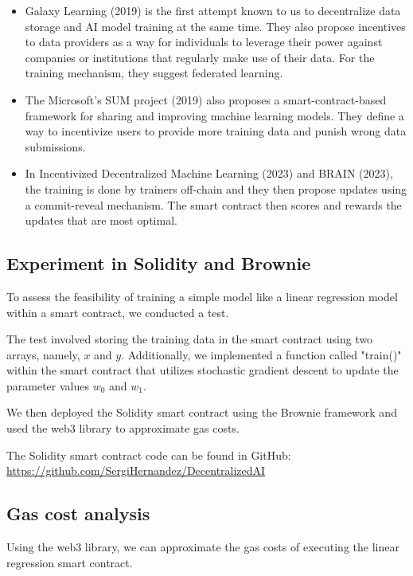 \documentclass[conference]{IEEEtran}
\begin{document}
\begin{itemize}
\item Galaxy Learning (2019)\cite{b15} is the first attempt known to us to decentralize data storage and AI model training at the same time. They also propose incentives to data providers as a way for individuals to leverage their power against companies or institutions that regularly make use of their data. For the training mechanism, they suggest federated learning.
\item The Microsoft's SUM project (2019)\cite{b16} also proposes a smart-contract-based framework for sharing and improving machine learning models. They define a way to incentivize users to provide more training data and punish wrong data submissions.
\item In Incentivized Decentralized Machine Learning (2023)\cite{b17} and BRAIN (2023)\cite{b18}, the training is done by trainers off-chain and they then propose updates using a commit-reveal mechanism. The smart contract then scores and rewards the updates that are most optimal.
\end{itemize}

\subsection{Experiment in Solidity and Brownie}

To assess the feasibility of training a simple model like a linear regression model within a smart contract, we conducted a test.

The test involved storing the training data in the smart contract using two arrays, namely, $x$ and $y$. Additionally, we implemented a function called "train()" within the smart contract that utilizes stochastic gradient descent to update the parameter values $w_0$ and $w_1$.

We then deployed the Solidity smart contract using the Brownie framework and used the web3 library to approximate gas costs.

The Solidity smart contract code can be found in GitHub: \url{https://github.com/SergiHernandez/DecentralizedAI}

\subsection{Gas cost analysis}

Using the web3 library, we can approximate the gas costs of executing the linear regression smart contract.
\end{document}
